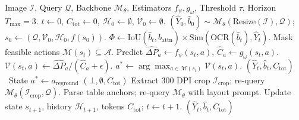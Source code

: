 \documentclass[11pt]{article}
\begin{document}
\begin{algorithm}[h]
\small
\caption{\textsc{GVoC} Online Decision Policy}
\label{alg:gvoc_policy}
\begin{algorithmic}[1]
\Require Image $\mathcal{I}$, Query $\mathcal{Q}$, Backbone $\mathcal{M}_\theta$, Estimators $f_\psi, g_\omega$, Threshold $\tau$, Horizon $T_{\max}=3$.
\State $t \leftarrow 0$, $C_{\text{tot}} \leftarrow 0$, $\mathcal{H}_0 \leftarrow \emptyset$, $\mathcal{V}_0 \leftarrow \emptyset$.
\State $(\hat{Y}_0, \hat{b}_0) \sim \mathcal{M}_\theta(\text{Resize}(\mathcal{I}), \mathcal{Q})$; $s_0 \leftarrow (\mathcal{Q}, \mathcal{V}_0, \mathcal{H}_0, f(s_0))$.
    \State $\Phi \leftarrow \text{IoU}(\hat{b}_t, b_{\text{attn}}) \times \text{Sim}(\text{OCR}(\hat{b}_t), \hat{Y}_t)$.
    \State Mask feasible actions $\mathcal{M}(s_t) \subseteq \mathcal{A}$.
        \State Predict $\hat{\Delta P}_a \leftarrow f_\psi(s_t, a)$, $\hat{C}_a \leftarrow g_\omega(s_t, a)$.
        \State $\mathcal{V}(s_t, a) \leftarrow \hat{\Delta P}_a / (\hat{C}_a + \epsilon)$.
    \EndFor
    \State $a^* \leftarrow \arg\max_{a \in \mathcal{M}(s_t)} \mathcal{V}(s_t, a)$.
         \Return $(\hat{Y}_t, \hat{b}_t, C_{\text{tot}})$
        \Else \ State $a^* \leftarrow a_{\text{reground}}$ 
        \EndIf
    \EndIf
     \Return $(\bot, \emptyset, C_{\text{tot}})$
        \State Extract 300 DPI crop $\mathcal{I}_{\text{crop}}$; re-query $\mathcal{M}_\theta(\mathcal{I}_{\text{crop}}, \mathcal{Q})$.
        \State Parse table anchors; re-query $\mathcal{M}_\theta$ with layout prompt.
    \EndIf
    \State Update state $s_{t+1}$, history $\mathcal{H}_{t+1}$, tokens $C_{\text{tot}}$; $t \leftarrow t + 1$.
\EndWhile
\State \Return $(\hat{Y}_t, \hat{b}_t, C_{\text{tot}})$ 
\end{algorithmic}
\end{algorithm}
\end{document}
